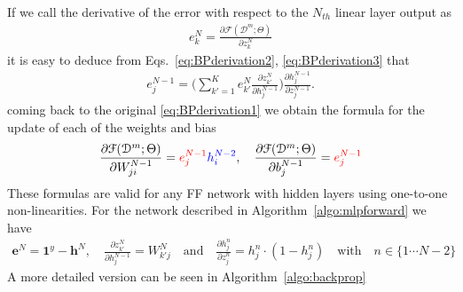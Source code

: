 %
If we call the derivative of the error with respect to the $N_{th}$ linear layer output as
\begin{align}
        e^{N}_k = \frac{\partial \mathcal{F}(\mathcal{D}^m;\Theta)}{\partial z_{k}^{N}}
\label{eq:BPderivation4}
\end{align}
%
\noindent it is easy to deduce from Eqs.~\ref{eq:BPderivation2}, \ref{eq:BPderivation3} that
%
\begin{align}
        e^{N-1}_j = \bigg(\sum_{k'=1}^{K} e^N_{k'} \frac{\partial z_{k'}^{N}}{\partial h_{j}^{N-1}}\bigg)\frac{\partial h_{j}^{N-1}}{\partial z_{j}^{N-1}}.
\label{eq:BPderivation5}
\end{align}
%
\noindent coming back to the original \ref{eq:BPderivation1} we obtain the formula for the update of each of the weights and bias
%
\begin{align}
        \frac{\partial \mathcal{F}(\mathcal{D}^m;\Theta)}{\partial W_{ji}^{N-1}}  = {\color{red} e^{N-1}_j} {\color{blue} h_i^{N-2}},  \quad \frac{\partial \mathcal{F}(\mathcal{D}^m;\Theta)}{\partial b_{j}^{N-1}}  = {\color{red} e^{N-1}_j}
\label{eq:BPderivation6}
\end{align}
%
These formulas are valid for any FF network with hidden layers using one-to-one non-linearities. For the network described in Algorithm~\ref{algo:mlpforward} we have
%
\begin{align}
        \mathbf{e}^{N} =  \mathrm{\mathbf{1}}^{y} - \mathbf{h}^N,
  \quad
        \frac{\partial z_{k'}^N}{\partial h_j^{N-1}} = W_{k'j}^N \quad \mbox{and} \quad
        \frac{\partial h_{j}^n}{\partial z_{j}^n} = h^n_{j}\cdot (1-h^n_{j}) \quad \mbox{with} \quad n \in \{1 \cdots N-2\}
\label{eq:BPderivation7}
\end{align}
%
A more detailed version can be seen in Algorithm~\ref{algo:backprop}
